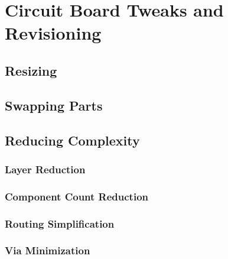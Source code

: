 
\chapter{Circuit Board Tweaks and Revisioning}
\section{Resizing}

\section{Swapping Parts}

\section{Reducing Complexity}
\subsection{Layer Reduction}
\subsection{Component Count Reduction}
\subsection{Routing Simplification}
\subsection{Via Minimization}